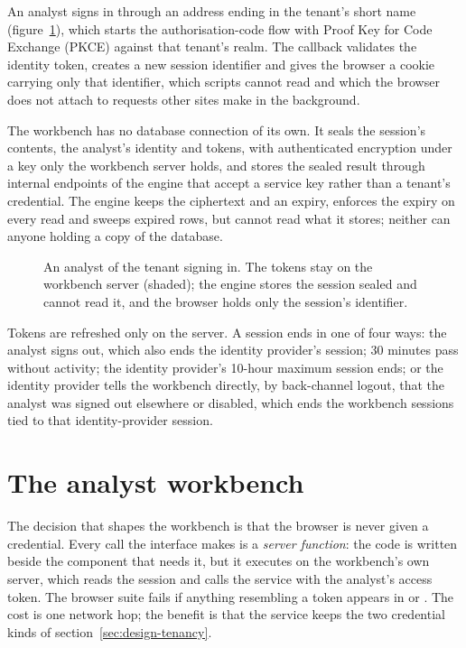 An analyst signs in through an address ending in the tenant's short name (figure~\ref{fig:signin}), which starts
the authorisation-code flow with Proof Key for Code Exchange (PKCE) against that tenant's realm. The callback validates the identity token, creates a new
session identifier and gives the browser a cookie carrying only that identifier, which scripts cannot read and
which the browser does not attach to requests other sites make in the background.

The workbench has no database connection of its own. It seals the session's contents, the analyst's identity and
tokens, with authenticated encryption under a key only the workbench server holds, and stores the sealed result
through internal endpoints of the engine that accept a service key rather than a tenant's credential. The engine
keeps the ciphertext and an expiry, enforces the expiry on every read and sweeps expired rows, but cannot read
what it stores; neither can anyone holding a copy of the database.

\begin{figure}[htbp]
\centering
\resizebox{\textwidth}{!}{}
\caption{An analyst of the tenant  signing in. The tokens stay on the workbench server (shaded); the
engine stores the session sealed and cannot read it, and the browser holds only the session's identifier.}
\label{fig:signin}
\end{figure}

Tokens are refreshed only on the server. A session ends in
one of four ways: the analyst signs out, which also ends the identity provider's session; 30 minutes pass
without activity; the identity provider's 10-hour maximum session ends; or the identity provider tells the
workbench directly, by back-channel logout, that the analyst was signed out elsewhere or disabled, which ends the
workbench sessions tied to that identity-provider session.

\section{The analyst workbench}
\label{sec:impl-workbench}

The decision that shapes the workbench is that the browser is never given a credential. Every call the interface
makes is a \emph{server function}: the code is written beside the component that needs it, but it executes on the
workbench's own server, which reads the session and calls the service with the analyst's access token. The
browser suite fails if anything resembling a token appears in  or . The
cost is one network hop; the benefit is that the service keeps the two credential kinds of
section~\ref{sec:design-tenancy}.

